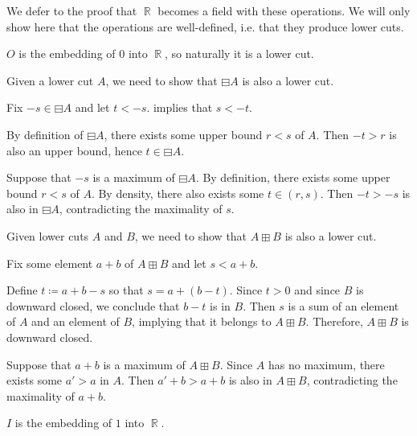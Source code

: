 \begin{defproof}
  We defer to  the proof that \( \BbbR \) becomes a field with these operations. We will only show here that the operations are well-defined, i.e. that they produce lower cuts.

   \( O \) is the embedding of \( 0 \) into \( \BbbR \), so naturally it is a lower cut.

   Given a lower cut \( A \), we need to show that \( \boxminus A \) is also a lower cut.

   Fix \( -s \in \boxminus A \) and let \( t < -s \).  implies that \( s < -t \).

  By definition of \( \boxminus A \), there exists some upper bound \( r < s \) of \( A \). Then \( -t > r \) is also an upper bound, hence \( t \in \boxminus A \).

   Suppose that \( -s \) is a maximum of \( \boxminus A \). By definition, there exists some upper bound \( r < s \) of \( A \). By density, there also exists some \( t \in (r, s) \). Then \( -t > -s \) is also in \( \boxminus A \), contradicting the maximality of \( s \).

   Given lower cuts \( A \) and \( B \), we need to show that \( A \boxplus B \) is also a lower cut.

   Fix some element \( a + b \) of \( A \boxplus B \) and let \( s < a + b \).

  Define \( t \coloneqq a + b - s \) so that \( s = a + (b - t) \). Since \( t > 0 \) and since \( B \) is downward closed, we conclude that \( b - t \) is in \( B \). Then \( s \) is a sum of an element of \( A \) and an element of \( B \), implying that it belongs to \( A \boxplus B \). Therefore, \( A \boxplus B \) is downward closed.

   Suppose that \( a + b \) is a maximum of \( A \boxplus B \). Since \( A \) has no maximum, there exists some \( a' > a \) in \( A \). Then \( a' + b > a + b \) is also in \( A \boxplus B \), contradicting the maximality of \( a + b \).

   \( I \) is the embedding of \( 1 \) into \( \BbbR \).


\end{defproof}
